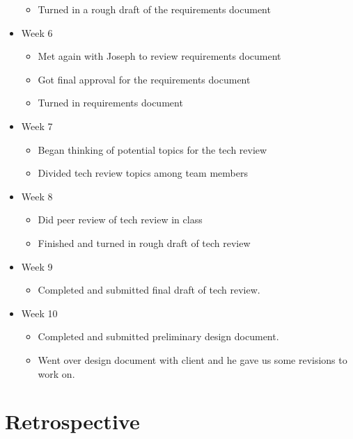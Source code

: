 \documentclass[onecolumn, draftclsnofoot,10pt, compsoc]{IEEEtran}
\begin{document}
\begin{itemize}
\begin{itemize}
    \item Turned in a rough draft of the requirements document
	\end{itemize}
\item Week 6
	\begin{itemize}
	\item Met again with Joseph to review requirements document
    \item Got final approval for the requirements document
    \item Turned in requirements document
	\end{itemize}
\item Week 7
	\begin{itemize}
	\item Began thinking of potential topics for the tech review
    \item Divided tech review topics among team members
	\end{itemize}
\item Week 8
	\begin{itemize}
	\item Did peer review of tech review in class
    \item Finished and turned in rough draft of tech review
	\end{itemize}
\item Week 9
	\begin{itemize}
	\item Completed and submitted final draft of tech review.
	\end{itemize}
\item Week 10
	\begin{itemize}
	\item Completed and submitted preliminary design document.
    \item Went over design document with client and he gave us some revisions to work on.
	\end{itemize}
\end{itemize}

\section{Retrospective}
\end{document}
